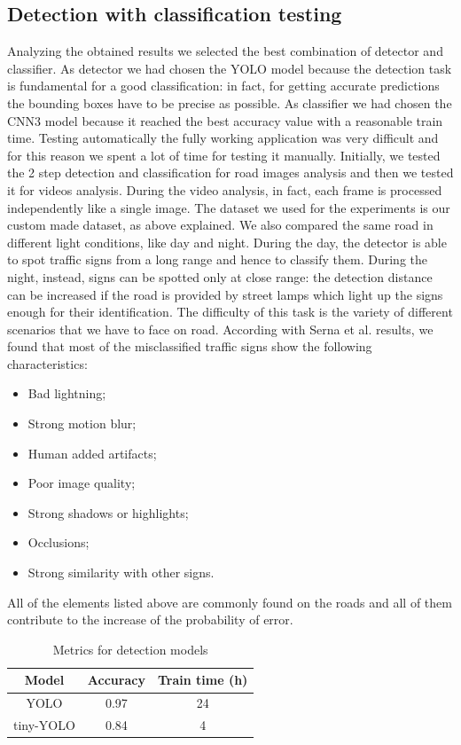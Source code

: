 \documentclass[10pt,twocolumn,letterpaper]{article}
\begin{document}
\subsection{Detection with classification testing}
Analyzing the obtained results we selected the best combination of detector and classifier. As detector we had chosen the YOLO model because the detection task is fundamental for a good classification: in fact, for getting accurate predictions the bounding boxes have to be precise as possible. As classifier we had chosen the CNN3 model because it reached the best accuracy value with a reasonable train time. Testing automatically the fully working application was very difficult and for this reason we spent a lot of time for testing it manually. Initially, we tested the 2 step detection and classification for road images analysis and then we tested it for videos analysis. During the video analysis, in fact, each frame is processed independently like a single image. The dataset we used for the experiments is our custom made dataset, as above explained. We also compared the same road in different light conditions, like day and night. During the day, the detector is able to spot traffic signs from a long range and hence to classify them. During the night, instead, signs can be spotted only at close range: the detection distance can be increased if the road is provided by street lamps which light up the signs enough for their identification. 
The difficulty of this task is the variety of different scenarios that we have to face on road. According with Serna et al. \cite{gamezPaper} results, we found that most of the misclassified traffic signs show the following characteristics:
\begin{itemize}[noitemsep,topsep=0pt]
	\item Bad lightning;
	\item Strong motion blur;
	\item Human added artifacts;
	\item Poor image quality;
	\item Strong shadows or highlights;
	\item Occlusions;
	\item Strong similarity with other signs.
\end{itemize} 
All of the elements listed above are commonly found on the roads and all of them contribute to the increase of the probability of error.

\begin{table}[h!]
	\begin{center}
		\begin{tabular}{|c|c|c|}
			\hline
			Model & Accuracy & Train time (h) \\
			\hline\hline
			YOLO & 0.97 & 24 \\
			tiny-YOLO & 0.84 & 4 \\
			\hline
		\end{tabular}
	\end{center}
	\caption{Metrics for detection models}
	\label{yolo-metrics}
\end{table}
\end{document}
